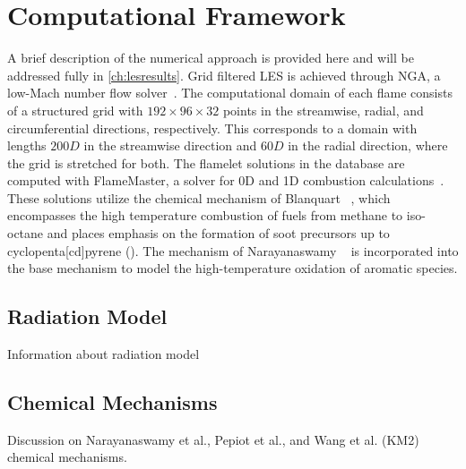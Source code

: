 \section{Computational Framework}
\label{sec:lesresults:comput}

A brief description of the numerical approach is provided here and will be addressed fully in \cref{ch:lesresults}. Grid filtered LES is achieved through NGA, a low-Mach number flow solver~\cite{desjardins2008}. The computational domain of each flame consists of a structured grid with $192 \times 96 \times 32$ points in the streamwise, radial, and circumferential directions, respectively. This corresponds to a domain with lengths $200D$ in the streamwise direction and $60D$ in the radial direction, where the grid is stretched for both. The flamelet solutions in the database are computed with FlameMaster, a solver for 0D and 1D combustion calculations~\cite{flamemaster}. These solutions utilize the chemical mechanism of Blanquart \etal~\cite{blanquart2009588}, which encompasses the high temperature combustion of fuels from methane to iso-octane and places emphasis on the formation of soot precursors up to cyclopenta[cd]pyrene (). The mechanism of Narayanaswamy \etal~\cite{narayanaswamy2010} is incorporated into the base mechanism to model the high-temperature oxidation of aromatic species.



\subsection{Radiation Model}
\label{sec:lesresults:comput:rad}

Information about radiation model


\subsection{Chemical Mechanisms}
\label{sec:lesresults:comput:chem}

Discussion on Narayanaswamy et al., Pepiot et al., and Wang et al. (KM2) chemical mechanisms.
